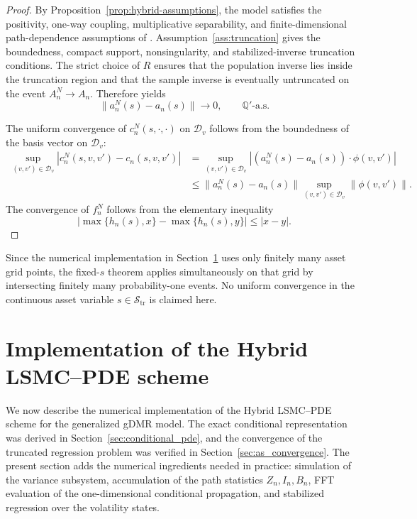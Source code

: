 \documentclass[pdflatex,sn-mathphys-num]{sn-jnl}
\theoremstyle{thmstyleone}%
\theoremstyle{thmstylethree}%
\theoremstyle{thmstyletwo}%
\newcommand{\Q}{\mathbb Q}
\begin{document}
\begin{proof}
By Proposition~\ref{prop:hybrid-assumptions}, the model satisfies the
positivity, one-way coupling, multiplicative separability, and
finite-dimensional path-dependence assumptions of
\cite[Theorem~1]{farahany2020mixing}. Assumption~\ref{ass:truncation} gives the
boundedness, compact support, nonsingularity, and stabilized-inverse truncation
conditions. The strict choice of $R$ ensures that the population inverse lies
inside the truncation region and that the sample inverse is eventually
untruncated on the event $A_n^N\to A_n$. Therefore
\cite[Theorem~1]{farahany2020mixing} yields
\[
    \|a_n^N(s)-a_n(s)\|\to0,
    \qquad
    \Q'\text{-a.s.}
\]

The uniform convergence of $c_n^N(s,\cdot,\cdot)$ on $\mathcal D_v$ follows
from the boundedness of the basis vector on $\mathcal D_v$:
\[
\begin{aligned}
    \sup_{(v,v')\in\mathcal D_v}
    |c_n^N(s,v,v')-c_n(s,v,v')|
    &=
    \sup_{(v,v')\in\mathcal D_v}
    |(a_n^N(s)-a_n(s))\cdot\phi(v,v')| \\
    &\le
    \|a_n^N(s)-a_n(s)\|
    \sup_{(v,v')\in\mathcal D_v}\|\phi(v,v')\|.
\end{aligned}
\]
The convergence of $f_n^N$ follows from the elementary inequality
\[
    |\max\{h_n(s),x\}-\max\{h_n(s),y\}|\le |x-y|.
\]
\end{proof}

Since the numerical implementation in Section~\ref{sec:hybrid-method} uses
only finitely many asset grid points, the fixed-$s$ theorem applies
simultaneously on that grid by intersecting finitely many probability-one
events. No uniform convergence in the continuous asset variable
$s\in\mathcal S_{\mathrm{tr}}$ is claimed here.




\section{Implementation of the Hybrid LSMC--PDE scheme}
\label{sec:hybrid-method}

We now describe the numerical implementation of the Hybrid LSMC--PDE scheme for
the generalized gDMR model. The exact conditional representation was derived in
Section~\ref{sec:conditional_pde}, and the convergence of the truncated
regression problem was verified in Section~\ref{sec:as_convergence}. The present
section adds the numerical ingredients needed in practice: simulation of the
variance subsystem, accumulation of the path statistics $Z_n,I_n,B_n$, FFT
evaluation of the one-dimensional conditional propagation, and stabilized
regression over the volatility states.
\end{document}

